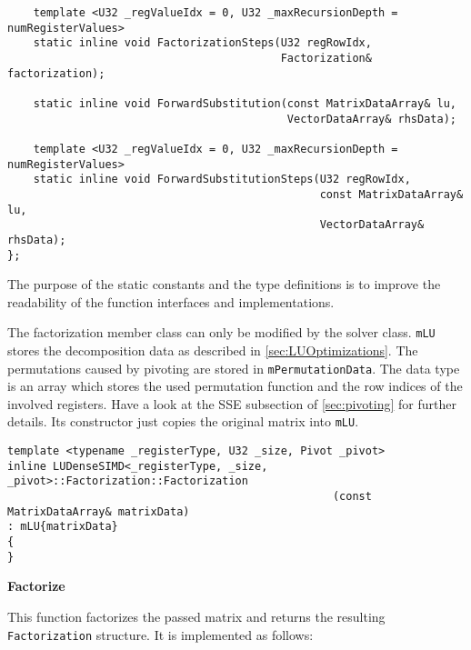 \begin{verbatim}
    template <U32 _regValueIdx = 0, U32 _maxRecursionDepth = numRegisterValues>
    static inline void FactorizationSteps(U32 regRowIdx, 
                                          Factorization& factorization);

    static inline void ForwardSubstitution(const MatrixDataArray& lu, 
                                           VectorDataArray& rhsData);

    template <U32 _regValueIdx = 0, U32 _maxRecursionDepth = numRegisterValues>
    static inline void ForwardSubstitutionSteps(U32 regRowIdx, 
                                                const MatrixDataArray& lu, 
                                                VectorDataArray& rhsData);
};
\end{verbatim}

The purpose of the static constants and the type definitions is to improve the readability of the function interfaces and implementations.

The factorization member class can only be modified by the solver class.
\texttt{mLU} stores the decomposition data as described in \cref{sec:LUOptimizations}.
The permutations caused by pivoting are stored in \texttt{mPermutationData}.
The data type is an array which stores the used permutation function and the row indices of the involved registers.
Have a look at the SSE subsection of \cref{sec:pivoting} for further details.
Its constructor just copies the original matrix into \texttt{mLU}.

\begin{verbatim}
template <typename _registerType, U32 _size, Pivot _pivot>
inline LUDenseSIMD<_registerType, _size, _pivot>::Factorization::Factorization
                                                  (const MatrixDataArray& matrixData)
: mLU{matrixData}
{
}
\end{verbatim}



\vspace{1cm}
\textbf{Factorize}
\vspace{0.5cm}

This function factorizes the passed matrix and returns the resulting \texttt{Factorization} structure.
It is implemented as follows:

